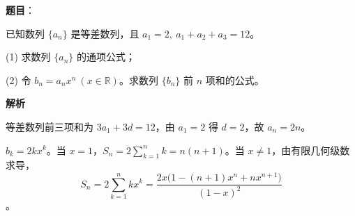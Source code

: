 \begin{answer}

\textbf{题目}：

已知数列 \(\{a_n\}\) 是等差数列，且 \(a_1=2,\ a_1+a_2+a_3=12\)。

    (1) 求数列 \(\{a_n\}\) 的通项公式；

    (2) 令 \(b_n=a_nx^n\ (x\in\mathbb R)\)。求数列 \(\{b_n\}\) 前 \(n\) 项和的公式。

\textbf{解析}


等差数列前三项和为 \(3a_1+3d=12\)，由 \(a_1=2\) 得 \(d=2\)，故 \(a_n=2n\)。


\(b_k=2kx^k\)。当 \(x=1\)，\(S_n=2\sum_{k=1}^n k=n(n+1)\)。当 \(x\ne1\)，由有限几何级数求导，
\nopagebreak[4]
\[
S_n=2\sum_{k=1}^n kx^k=\frac{2x\bigl(1-(n+1)x^n+nx^{n+1}\bigr)}{(1-x)^2}
\]
。



\end{answer}
